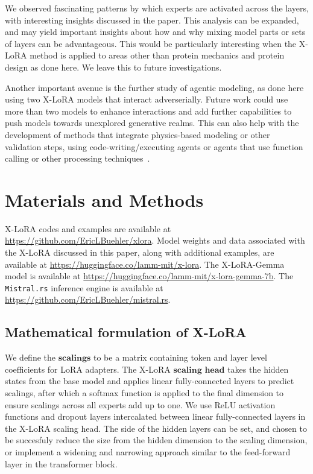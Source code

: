 We observed fascinating patterns by which experts are activated across the layers, with interesting insights discussed in the paper. This analysis can be expanded, and may yield important insights about how and why mixing model parts or sets of layers can be advantageous. This would be particularly interesting when the X-LoRA method is applied to areas other than protein mechanics and protein design as done here. We leave this to future investigations. 

Another important avenue is the further study of agentic modeling, as done here using two X-LoRA models that interact adverserially. Future work could use more than two models to enhance interactions and add further capabilities to push models towards unexplored generative realms. This can also help with the development of methods that integrate physics-based modeling or other validation steps, using code-writing/executing agents or agents that use function calling or other processing techniques~\cite{Ghafarollahi2024ProtAgents:Learning}. 


\section{Materials and Methods}

X-LoRA codes and examples are available at \url{https://github.com/EricLBuehler/xlora}. Model weights and data associated with the X-LoRA discussed in this paper, along with additional examples, are available at \url{https://huggingface.co/lamm-mit/x-lora}. The X-LoRA-Gemma model is available at \url{https://huggingface.co/lamm-mit/x-lora-gemma-7b}.  The \texttt{Mistral.rs} inference engine is available at \url{https://github.com/EricLBuehler/mistral.rs}.

\subsection{Mathematical formulation of X-LoRA}
We define the $\mathbf{scalings}$ to be a matrix containing token and layer level coefficients for LoRA adapters. The X-LoRA $\mathbf{scaling}$ $\mathbf{head}$ takes the hidden states from the base model and applies linear fully-connected layers to predict scalings, after which a softmax function is applied to the final dimension to ensure scalings across all experts add up to one. 
We use ReLU activation functions and dropout layers intercalated between linear fully-connected layers in the X-LoRA scaling head. The side of the hidden layers can be set, and chosen to be succesfuly reduce the size from the hidden dimension to the scaling dimension, or implement a widening and narrowing approach similar to the feed-forward layer in the transformer block. 


